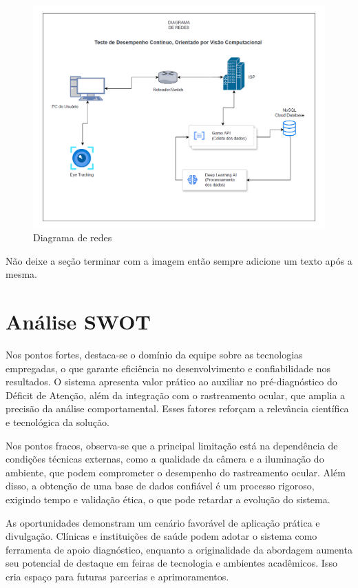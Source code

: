 \documentclass[
  a4paper,%
  12pt,%
  english,%
  brazilian,%
]{article}
\begin{document}
\begin{figure}[H]
\centering
\caption{Diagrama de redes}%
\label{fig:diagrama-de-redes}
\includegraphics[width=1.1\textwidth]{Logos/diagrama-de-redes.png}
\end{figure}

    Não deixe a seção terminar com a imagem então sempre adicione um texto após a mesma.

\section*{Análise SWOT}

Nos pontos fortes, destaca-se o domínio da equipe sobre as tecnologias empregadas, o que garante eficiência no desenvolvimento e confiabilidade nos resultados. O sistema apresenta valor prático ao auxiliar no pré-diagnóstico do Déficit de Atenção, além da integração com o rastreamento ocular, que amplia a precisão da análise comportamental. Esses fatores reforçam a relevância científica e tecnológica da solução.

Nos pontos fracos, observa-se que a principal limitação está na dependência de condições técnicas externas, como a qualidade da câmera e a iluminação do ambiente, que podem comprometer o desempenho do rastreamento ocular. Além disso, a obtenção de uma base de dados confiável é um processo rigoroso, exigindo tempo e validação ética, o que pode retardar a evolução do sistema.

As oportunidades demonstram um cenário favorável de aplicação prática e divulgação. Clínicas e instituições de saúde podem adotar o sistema como ferramenta de apoio diagnóstico, enquanto a originalidade da abordagem aumenta seu potencial de destaque em feiras de tecnologia e ambientes acadêmicos. Isso cria espaço para futuras parcerias e aprimoramentos.
\end{document}
